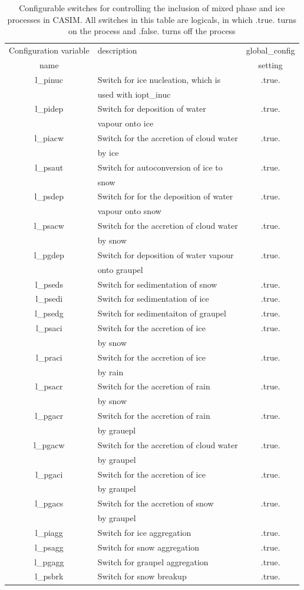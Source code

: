 \documentclass[a4paper,11pt]{article}
\begin{document}
\begin{table}[H]
  \protect\caption{Configurable switches for controlling the inclusion of mixed phase
   and ice processes in CASIM. All switches in this table are logicals, in which .true. turns
   on the process and .false. turns off the process}
\label{tab:cold_casim_setup}
\begin{tabular}{|c|l|c|}
\hline
Configuration variable & description & global\_config \tabularnewline
name &  & setting \tabularnewline
\hline
\hline
  l\_pinuc & Switch for ice nucleation, which is & .true. \tabularnewline
    & used with iopt\_inuc & \tabularnewline
\hline
  l\_pidep & Switch for deposition of water  & .true. \tabularnewline
    & vapour onto ice & \tabularnewline
\hline
  l\_piacw & Switch for the accretion of cloud water & .true. \tabularnewline
    & by ice & \tabularnewline
\hline
  l\_psaut & Switch for autoconversion of ice to & .true. \tabularnewline
    & snow & \tabularnewline
\hline
  l\_psdep & Switch for for the deposition of water & .true. \tabularnewline
    & vapour onto snow & \tabularnewline
\hline
  l\_psacw & Switch for the accretion of cloud water & .true. \tabularnewline
    & by snow & \tabularnewline
\hline
  l\_pgdep & Switch for deposition of water vapour & .true. \tabularnewline
    & onto graupel & \tabularnewline
\hline
  l\_pseds & Switch for sedimentation of snow & .true. \tabularnewline
\hline
  l\_psedi & Switch for sedimentation of ice & .true. \tabularnewline
\hline
  l\_psedg & Switch for sedimentaiton of graupel & .true. \tabularnewline
\hline
  l\_psaci & Switch for the accretion of ice & .true. \tabularnewline
    & by snow & \tabularnewline
\hline
  l\_praci & Switch for the accretion of ice & .true. \tabularnewline
    & by rain & \tabularnewline
\hline
  l\_psacr & Switch for the accretion of rain  & .true. \tabularnewline
    & by snow & \tabularnewline
\hline
  l\_pgacr & Switch for the accretion of rain & .true. \tabularnewline
    & by grauepl & \tabularnewline
\hline
  l\_pgacw & Switch for the accretion of cloud water & .true. \tabularnewline
    & by graupel & \tabularnewline
\hline
  l\_pgaci & Switch for the accretion of ice & .true. \tabularnewline
    & by graupel & \tabularnewline
\hline
  l\_pgacs & Switch for the accretion of snow & .true. \tabularnewline
    & by graupel & \tabularnewline
\hline
  l\_piagg & Switch for ice aggregation & .true. \tabularnewline
\hline
  l\_psagg & Switch for snow aggregation & .true. \tabularnewline
\hline
  l\_pgagg & Switch for graupel aggregation & .true. \tabularnewline
\hline
  l\_psbrk & Switch for snow breakup & .true. \tabularnewline

\end{tabular}
\end{table}
\end{document}
